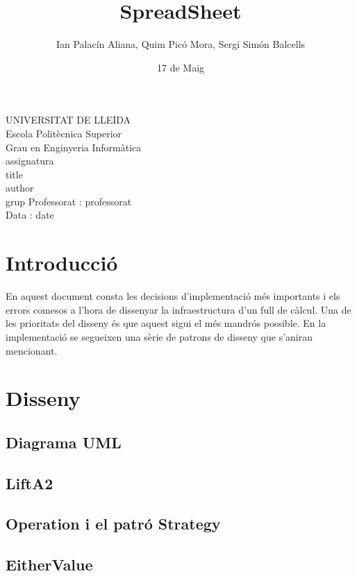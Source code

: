 \documentclass{article}
\title{SpreadSheet}
\author{Ian Palacín Aliana, Quim Picó Mora, Sergi Simón Balcells}
\date{17 de Maig}
\renewcommand{\maketitle}{ %
	\begin{titlepage}
		\raggedright{UNIVERSITAT DE LLEIDA \\
			Escola Politècnica Superior \\
			Grau en Enginyeria Informàtica\\
			\1assignatura\\}
		\vspace{5cm}
		\centering\huge{\5title \\}
		\vspace{3cm}
		\large{\6author} \\
		\normalsize{\3grup}
		\vfill
		Professorat : \4professorat \\
		Data : \7date
\end{titlepage}}
\begin{document}
	\maketitle
	\newpage
	\section{Introducció}%

	En aquest document consta les decisions d'implementació més importants i els errors comesos
	a l'hora de dissenyar la infraestructura d'un full de càlcul. Una de les prioritats del disseny
	és que aquest sigui el més mandrós possible. En la implementació se segueixen una sèrie de patrons
	de disseny que s'aniran mencionant.



	\section{Disseny}
	\subsection{Diagrama UML}%
	\subsection{LiftA2}%
	 
	\subsection{Operation i el patró Strategy}
	
	\subsection{EitherValue}%
	
\end{document}
